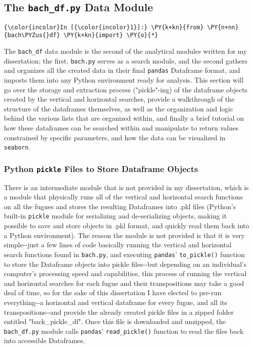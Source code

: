     \subsection{\texorpdfstring{The \texttt{bach\_df.py} Data
Module}{The bach\_df.py Data Module}}\label{the-bach_df.py-data-module}

    \begin{Verbatim}[commandchars=\\\{\}]
{\color{incolor}In [{\color{incolor}1}]:} \PY{k+kn}{from} \PY{n+nn}{bach\PYZus{}df} \PY{k+kn}{import} \PY{o}{*}
\end{Verbatim}

    The \texttt{bach\_df} data module is the second of the analytical
modules written for my dissertation; the first, \texttt{bach.py} serves
as a search module, and the second gathers and organizes all the created
data in their final \texttt{pandas} Dataframe format, and imports them
into any Python environment ready for analysis. This section will go
over the storage and extraction process ("pickle"-ing) of the dataframe
objects created by the vertical and horizontal searches, provide a
walkthrough of the structure of the dataframes themselves, as well as
the organization and logic behind the various lists that are organized
within, and finally a brief tutorial on how these dataframes can be
searched within and manipulate to return values constrained by specific
parameters, and how the data can be visualized in \texttt{seaborn}.

\subsubsection{\texorpdfstring{Python \texttt{pickle} Files to Store
Dataframe
Objects}{Python pickle Files to Store Dataframe Objects}}\label{python-pickle-files-to-store-dataframe-objects}

There is an intermediate module that is not provided in my dissertation,
which is a module that physically runs all of the vertical and
horizontal search functions on all the fugues and stores the resulting
Dataframes into .pkl files (Python's built-in \texttt{pickle} module for
serializing and de-serializing objects, making it possible to save and
store objects in .pkl format, and quickly read them back into a Python
environment). The reason the module is not provided is that it is very
simple-\/-just a few lines of code basically running the vertical and
horizontal search functions found in \texttt{bach.py}, and executing
\texttt{pandas}' \texttt{to\_pickle()} function to store the Dataframe
objects into pickle files-\/-but depending on an individual's computer's
processing speed and capabilities, this process of running the vertical
and horizontal searches for each fugue and their transpositions may take
a good deal of time, so for the sake of this dissertation I have elected
to pre-run everything-\/-a horizontal and vertical dataframe for every
fugue, and all its transpositions-\/-and provide the already created
pickle files in a zipped folder entitled "back\_pickle\_df". Once this
file is downloaded and unzipped, the \texttt{bach\_df.py} module calls
\texttt{pandas}' \texttt{read\_pickle()} function to read the files back
into accessible Dataframes.

